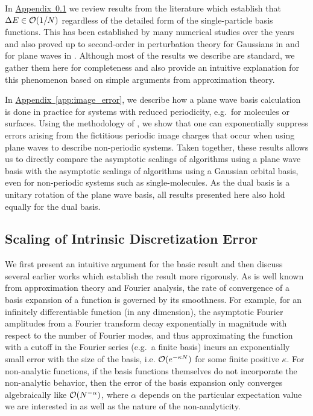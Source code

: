 \documentclass[superscriptaddress,aps,pra,nofootinbib,notitlepage,10pt,longbibliography]{revtex4-1}
\DeclareRobustCommand{\app}[1]{\hyperref[app:#1]{Appendix~\ref*{app:#1}}}
\begin{document}
In \app{intrinsic_error} we review results from the literature which establish that $\Delta E \in {\cal O} (1/N)$ regardless of the detailed form of the single-particle basis functions. This has been established by many numerical studies over the years and also proved up to second-order in perturbation theory for Gaussians in \cite{kutzelnigg1992rates} and for plane waves in \cite{shepherd2012convergence}. Although most of the results we describe are standard, we gather them here for completeness and also provide an intuitive explanation for this phenomenon based on simple arguments from approximation theory.

In \app{image_error}, we describe how a plane wave basis calculation is done in practice for systems with reduced periodicity, e.g.~for molecules or surfaces. Using the methodology of \cite{fusti2002accurate}, we show that one can exponentially suppress errors arising from the fictitious periodic image charges that occur when using plane waves to describe non-periodic systems. Taken together, these results allows us to directly compare the asymptotic scalings of algorithms using a plane wave basis with the asymptotic scalings of algorithms using a Gaussian orbital basis, even for non-periodic systems such as single-molecules. As the dual basis is a unitary rotation of the plane wave basis, all results presented here also hold equally for the dual basis.



\subsection{Scaling of Intrinsic Discretization Error}
\label{app:intrinsic_error}

We first present an intuitive argument for the basic result and then discuss several earlier works which establish the result more rigorously. As is well known from approximation theory and Fourier analysis, the rate of convergence of a basis expansion of a function is governed by its smoothness. For example, for an infinitely differentiable function (in any dimension), the asymptotic Fourier amplitudes from a Fourier transform decay exponentially in magnitude with respect to the number of Fourier modes, and thus approximating the function with a cutoff in the Fourier series (e.g.~a finite basis) incurs an exponentially small error with the size of the basis, i.e. ${\cal O} (e^{-\kappa N})$ for some finite positive $\kappa$. For non-analytic functions, if the basis functions themselves do not incorporate the non-analytic behavior, then the error of the basis expansion only converges algebraically like ${\cal O} (N^{-\alpha})$, where $\alpha$ depends on the particular expectation value we are interested in as well as the nature of the non-analyticity.
\end{document}
